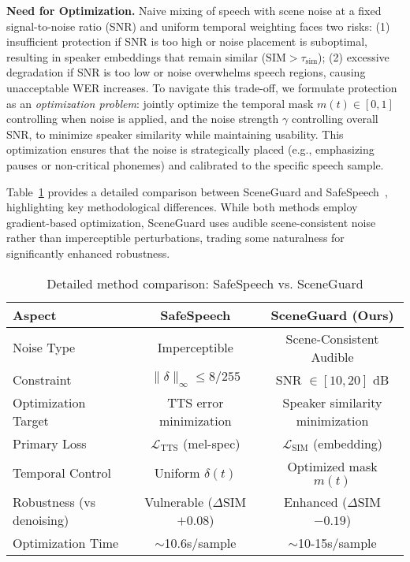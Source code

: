 \textbf{Need for Optimization.}
Naive mixing of speech with scene noise at a fixed signal-to-noise ratio (SNR) and uniform temporal weighting faces two risks: (1) insufficient protection if SNR is too high or noise placement is suboptimal, resulting in speaker embeddings that remain similar ($\text{SIM} > \tau_{\text{sim}}$); (2) excessive degradation if SNR is too low or noise overwhelms speech regions, causing unacceptable WER increases. To navigate this trade-off, we formulate protection as an \textit{optimization problem}: jointly optimize the temporal mask $m(t) \in [0,1]$ controlling when noise is applied, and the noise strength $\gamma$ controlling overall SNR, to minimize speaker similarity while maintaining usability. This optimization ensures that the noise is strategically placed (e.g., emphasizing pauses or non-critical phonemes) and calibrated to the specific speech sample.

Table~\ref{tab:method_comparison} provides a detailed comparison between SceneGuard and SafeSpeech~\citep{safespeech}, highlighting key methodological differences. While both methods employ gradient-based optimization, SceneGuard uses audible scene-consistent noise rather than imperceptible perturbations, trading some naturalness for significantly enhanced robustness.

\begin{table}[t]
\centering
\caption{Detailed method comparison: SafeSpeech vs. SceneGuard}
\label{tab:method_comparison}
\small
\begin{tabular}{lcc}
\toprule
\textbf{Aspect} & \textbf{SafeSpeech} & \textbf{SceneGuard (Ours)} \\
\midrule
Noise Type & Imperceptible & Scene-Consistent Audible \\
Constraint & $\|\delta\|_\infty \leq 8/255$ & SNR $\in [10, 20]$ dB \\
Optimization Target & TTS error minimization & Speaker similarity minimization \\
Primary Loss & $\mathcal{L}_{\text{TTS}}$ (mel-spec) & $\mathcal{L}_{\text{SIM}}$ (embedding) \\
Temporal Control & Uniform $\delta(t)$ & Optimized mask $m(t)$ \\
Robustness (vs denoising) & Vulnerable ($\Delta$SIM $+0.08$) & Enhanced ($\Delta$SIM $-0.19$) \\
Optimization Time & $\sim$10.6s/sample & $\sim$10-15s/sample \\
\bottomrule
\end{tabular}
\end{table}


